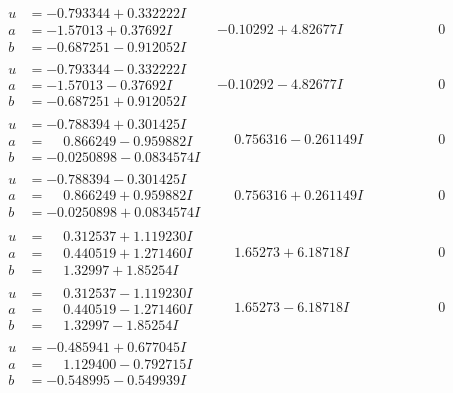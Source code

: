 \documentclass[1p]{elsarticle_modified}
\theoremstyle{definition}
\begin{document}
$$\begin{array}{c|c|c}
\begin{aligned}
u &= -0.793344 + 0.332222 I \\
a &= -1.57013 + 0.37692 I \\
b &= -0.687251 - 0.912052 I\end{aligned}
 & -0.10292 + 4.82677 I & \phantom{-0.000000 } 0 \\ \hline\begin{aligned}
u &= -0.793344 - 0.332222 I \\
a &= -1.57013 - 0.37692 I \\
b &= -0.687251 + 0.912052 I\end{aligned}
 & -0.10292 - 4.82677 I & \phantom{-0.000000 } 0 \\ \hline\begin{aligned}
u &= -0.788394 + 0.301425 I \\
a &= \phantom{-}0.866249 - 0.959882 I \\
b &= -0.0250898 - 0.0834574 I\end{aligned}
 & \phantom{-}0.756316 - 0.261149 I & \phantom{-0.000000 } 0 \\ \hline\begin{aligned}
u &= -0.788394 - 0.301425 I \\
a &= \phantom{-}0.866249 + 0.959882 I \\
b &= -0.0250898 + 0.0834574 I\end{aligned}
 & \phantom{-}0.756316 + 0.261149 I & \phantom{-0.000000 } 0 \\ \hline\begin{aligned}
u &= \phantom{-}0.312537 + 1.119230 I \\
a &= \phantom{-}0.440519 + 1.271460 I \\
b &= \phantom{-}1.32997 + 1.85254 I\end{aligned}
 & \phantom{-}1.65273 + 6.18718 I & \phantom{-0.000000 } 0 \\ \hline\begin{aligned}
u &= \phantom{-}0.312537 - 1.119230 I \\
a &= \phantom{-}0.440519 - 1.271460 I \\
b &= \phantom{-}1.32997 - 1.85254 I\end{aligned}
 & \phantom{-}1.65273 - 6.18718 I & \phantom{-0.000000 } 0 \\ \hline\begin{aligned}
u &= -0.485941 + 0.677045 I \\
a &= \phantom{-}1.129400 - 0.792715 I \\
b &= -0.548995 - 0.549939 I\end{aligned}

\end{array}$$
\end{document}
